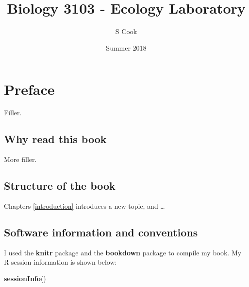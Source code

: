 \documentclass[]{book}
\title{Biology 3103 - Ecology Laboratory}
\author{S Cook}
\date{Summer 2018}
\makeatletter
\newenvironment{Shaded}{\begin{snugshade}}{\end{snugshade}}
\newcommand{\KeywordTok}[1]{\textcolor[rgb]{0.13,0.29,0.53}{\textbf{#1}}}
\newcommand{\NormalTok}[1]{#1}
\newenvironment{kframe}{%
\medskip{}
\setlength{\fboxsep}{.8em}
 \def\at@end@of@kframe{}%
 \ifinner\ifhmode%
  \def\at@end@of@kframe{\end{minipage}}%
  \begin{minipage}{\columnwidth}%
 \fi\fi%
 \def\FrameCommand##1{\hskip\@totalleftmargin \hskip-\fboxsep
 \colorbox{shadecolor}{##1}\hskip-\fboxsep
     \hskip-\linewidth \hskip-\@totalleftmargin \hskip\columnwidth}%
 \MakeFramed {\advance\hsize-\width
   \@totalleftmargin\z@ \linewidth\hsize
   \@setminipage}}%
 {\par\unskip\endMakeFramed%
 \at@end@of@kframe}
\renewenvironment{Shaded}{\begin{kframe}}{\end{kframe}}
\makeatother
\begin{document}
\maketitle


\thispagestyle{empty}

\begin{center}
\end{center}

\setlength{\abovedisplayskip}{-5pt}
\setlength{\abovedisplayshortskip}{-5pt}

{
\hypersetup{linkcolor=}
\setcounter{tocdepth}{2}
\tableofcontents
}
\listoftables
\listoffigures
\hypertarget{preface}{%
\chapter*{Preface}\label{preface}}


Filler.

\hypertarget{why-read-this-book}{%
\section*{Why read this book}\label{why-read-this-book}}


More filler.

\hypertarget{structure-of-the-book}{%
\section*{Structure of the book}\label{structure-of-the-book}}


Chapters \ref{introduction} introduces a new topic, and \ldots{}

\hypertarget{software-information-and-conventions}{%
\section*{Software information and conventions}\label{software-information-and-conventions}}


I used the \textbf{knitr} package \citep{xie2015} and the \textbf{bookdown} package \citep{R-bookdown} to compile my book. My R session information is shown below:

\begin{Shaded}
\begin{Highlighting}[]
\KeywordTok{sessionInfo}\NormalTok{()}
\end{Highlighting}
\end{Shaded}
\end{document}
